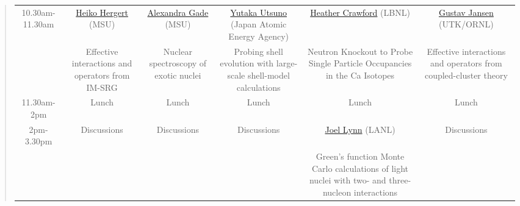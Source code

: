\documentclass[%
twoside,                 %
final,                   %
10pt]{article}
\begin{document}
\begin{quote}
\begin{tabular}{cccccc}
\hline
10.30am-11.30am & \href{{https://plus.google.com/105561779205361798723/about}}{Heiko Hergert} (MSU)                 & \href{{http://nuclearphysicsworkshops.github.io/ICNTatMichiganStateUniversity/doc/web/talks/gade.pdf}}{Alexandra Gade} (MSU) & \href{{https://scholar.google.com/citations?user=IWqpG7EAAAAJ}}{Yutaka Utsuno} (Japan Atomic Energy Agency)                      & \href{{http://nuclear-structure.lbl.gov/people/crawford}}{Heather Crawford} (LBNL)                 & \href{{https://scholar.google.com/citations?user=AhFzlysAAAAJ&hl=en}}{Gustav Jansen} (UTK/ORNL) \\
                & Effective interactions and operators from IM-SRG                                                  & Nuclear spectroscopy of exotic nuclei                                                                                        & Probing shell evolution with large-scale shell-model calculations                                                                & Neutron Knockout to Probe Single Particle Occupancies in the Ca Isotopes                           & Effective interactions and operators from coupled-cluster theory                                \\
\hline
11.30am-2pm     & Lunch                                                                                             & Lunch                                                                                                                        & Lunch                                                                                                                            & Lunch                                                                                              & Lunch                                                                                           \\
\hline
2pm-3.30pm      & Discussions                                                                                       & Discussions                                                                                                                  & Discussions                                                                                                                      & \href{{http://public.lanl.gov/jlynn/}}{Joel Lynn} (LANL)                                           & Discussions                                                                                     \\
                &                                                                                                   &                                                                                                                              &                                                                                                                                  & Green's function Monte Carlo calculations of light nuclei with two- and three-nucleon interactions &                                                                                                 \\

\end{tabular}
\end{quote}
\end{document}
